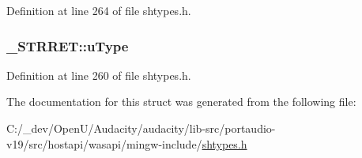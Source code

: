 Definition at line 264 of file shtypes.\+h.

\subsubsection[{\texorpdfstring{u\+Type}{uType}}]{ \+\_\+\+S\+T\+R\+R\+E\+T\+::u\+Type}\hypertarget{struct___s_t_r_r_e_t_a174dec7ee79f84d4082df2e09941913d}{}\label{struct___s_t_r_r_e_t_a174dec7ee79f84d4082df2e09941913d}


Definition at line 260 of file shtypes.\+h.



The documentation for this struct was generated from the following file\+:\begin{DoxyCompactItemize}
\item 
C\+:/\+\_\+dev/\+Open\+U/\+Audacity/audacity/lib-\/src/portaudio-\/v19/src/hostapi/wasapi/mingw-\/include/\hyperlink{shtypes_8h}{shtypes.\+h}\end{DoxyCompactItemize}
